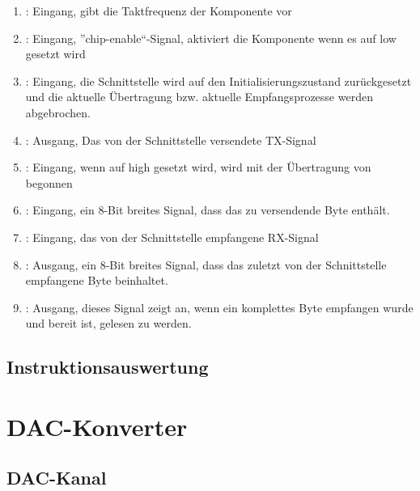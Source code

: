 \begin{enumerate}
\item {}: Eingang, gibt die Taktfrequenz der Komponente vor
\item {}: Eingang, ''chip-enable``-Signal, aktiviert die Komponente wenn es auf
  low gesetzt wird
\item {}: Eingang, die Schnittstelle wird auf den Initialisierungszustand
  zurückgesetzt und die aktuelle Übertragung bzw. aktuelle Empfangsprozesse
  werden abgebrochen.

\item {}: Ausgang, Das von der Schnittstelle versendete TX-Signal 
  \item {}: Eingang, wenn  auf high gesetzt wird, wird mit der
    Übertragung von  begonnen
\item {}: Eingang, ein 8-Bit breites Signal, dass das zu versendende Byte enthält.

\item {}: Eingang, das von der Schnittstelle empfangene RX-Signal
\item {}: Ausgang, ein 8-Bit breites Signal, dass das zuletzt von der
  Schnittstelle empfangene Byte beinhaltet.
\item {}: Ausgang, dieses Signal zeigt an, wenn ein komplettes Byte
  empfangen wurde und bereit ist, gelesen zu werden.
\end{enumerate}
  
\subsection{Instruktionsauswertung}

\section{DAC-Konverter}
\subsection{DAC-Kanal}


